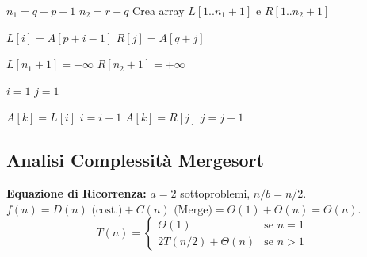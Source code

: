 \begin{algorithmic}[1]
    \State $n_1 = q - p + 1$ 
    \State $n_2 = r - q$ 
    \State Crea array $L[1..n_1+1]$ e $R[1..n_2+1]$ 
    
        \State $L[i] = A[p + i - 1]$ 
    \EndFor
        \State $R[j] = A[q + j]$ 
    \EndFor
    
    \State $L[n_1 + 1] = +\infty$ 
    \State $R[n_2 + 1] = +\infty$ 
    
    \State $i = 1$ 
    \State $j = 1$ 
    
            \State $A[k] = L[i]$ 
            \State $i = i + 1$ 
        \Else
            \State $A[k] = R[j]$
            \State $j = j + 1$
        \EndIf
    \EndFor
\EndProcedure
\end{algorithmic}

\subsection{Analisi Complessità Mergesort }

\begin{definition}
\textbf{Equazione di Ricorrenza:}
$a=2$ sottoproblemi, $n/b = n/2$.
$f(n) = D(n) \text{ (cost.)} + C(n) \text{ (Merge)} = \Theta(1) + \Theta(n) = \Theta(n)$.
$$ T(n) = \begin{cases} \Theta(1) & \text{se } n = 1 \text{ } \\ 2T(n/2) + \Theta(n) & \text{se } n > 1 \text{ } \end{cases} $$
\end{definition}

